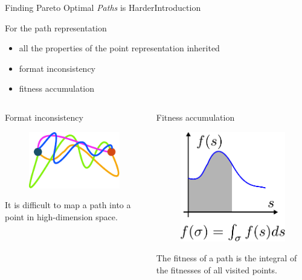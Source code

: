 \begin{frame}{Finding Pareto Optimal {\em Paths} is Harder}{Introduction}

For the path representation
\begin{itemize}
\item \textcolor{diff-path}{all the properties of the point representation inherited}
\item \textcolor{diff-path}{format inconsistency}
\item \textcolor{diff-path}{fitness accumulation}
\end{itemize}

\begin{columns}
\begin{block}{Format inconsistency}
	\begin{figure}
		\centering
		\includegraphics[width=.6\linewidth]{figure/diff_paths}
	\end{figure}
	\footnotesize{
	It is difficult to map a path into a point in high-dimension space.  
	}
\end{block}
\begin{block}{Fitness accumulation}
	\begin{figure}
		\centering
		\includegraphics[width=.35\linewidth]{figure/path_integral}
	\end{figure}
	\footnotesize{
	The fitness of a path is the integral of the fitnesses of all visited points.
	}
\end{block}
\end{columns}

\end{frame}

